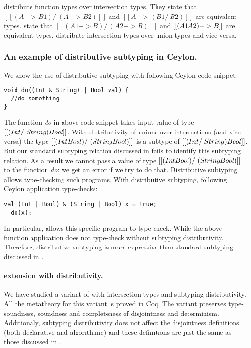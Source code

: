   distribute function types over intersection types.
They state that $[[(A -> B1) /\ (A -> B2)]]$ and $[[A -> (B1 /\ B2)]]$ are equivalent types.
 state that $[[(A1 -> B) /\ (A2 -> B)]]$ and $[[(A1 \/ A2) -> B]]$
are equivalent types.
 distribute intersection types over union types and vice versa.

\subsubsection*{An example of distributive subtyping in Ceylon.}
We show the use of distributive subtyping with following Ceylon code snippet:

\begin{lstlisting}[xleftmargin=.2\textwidth, xrightmargin=.2\textwidth]
void do((Int & String) | Bool val) {
  //do something
}
\end{lstlisting}

\noindent The function \emph{do} in above code snippet takes input value of type 
$[[(Int /\ String) \/ Bool]]$. With distributivity of unions over intersections
(and vice-versa) the type $[[(Int \/ Bool) /\ (String \/ Bool)]]$ is a
subtype of $[[(Int /\ String) \/ Bool]]$.
But our standard subtyping relation discussed in 
fails to identify this subtyping relation.
As a result we cannot pass a
value of type $[[(Int \/ Bool) /\ (String \/ Bool)]]$ to the function
\emph{do}: we get an error if we try to do that.
Distributive subtyping allows type-checking such programs.
With distributive subtyping, following Ceylon application type-checks:

\begin{lstlisting}[xleftmargin=.2\textwidth, xrightmargin=.2\textwidth]
  val (Int | Bool) & (String | Bool) x = true;
  do(x);
\end{lstlisting}

\noindent In particular,  allows this specific program to type-check.
While the above function application does not type-check without
subtyping distributivity.
Therefore, distributive subtyping is more expressive than standard subtyping
discussed in .


\paragraph{\name extension with distributivity.}
We have studied a variant of \name with intersection types and subtyping distributivity.
All the metatheory for this variant is proved in Coq. The variant preserves
type-soundness, soundness and completeness of disjointness and determinism.
Additionaly, subtyping distributivity
does not affect the disjointness definitions (both declarative and algorithmic)
and these definitions are just the same as those discussed in .

